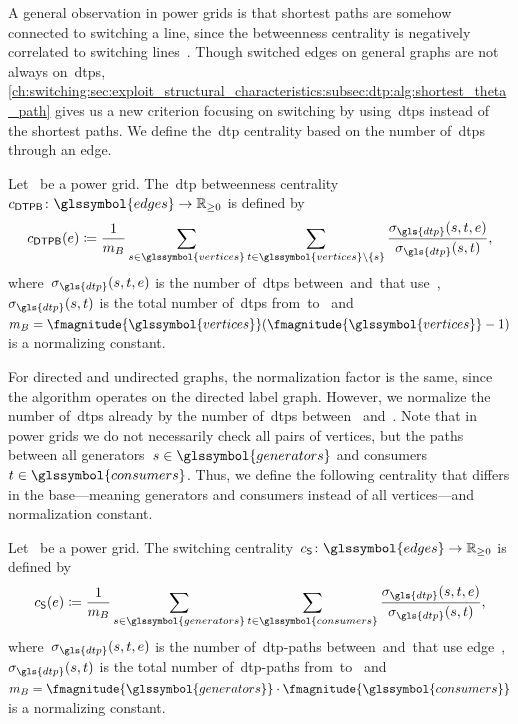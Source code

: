 A general observation in power grids is that shortest paths are somehow
connected to switching a line, since the betweenness centrality is negatively
correlated to switching lines~\parencite{4438889}.
% 
Though switched edges on general graphs are not always on~\gls{dtp}{s},
\cref{ch:switching:sec:exploit_structural_characteristics:subsec:dtp:alg:shortest_theta_path} gives us a new criterion focusing on switching by
using~\gls{dtp}{s} instead of the shortest paths. We define
the~\gls{dtp} centrality based on the number of~\gls{dtp}{s} through
an edge.
% 
\begin{definition}
% 
    Let~ be a power grid. The~\gls{dtp} betweenness
    centrality~$c_{\sbc}\colon\glssymbol{edges}\to\posreals$ is defined by
    \begin{equation}
        c_{\sbc}(\edge) \coloneqq 
        \frac{1}{m_B}\sum_{\source\in\glssymbol{vertices}}
        \sum_{\sink\in\glssymbol{vertices}\setminus\{\source\}}
        \frac{\sigma_{\gls{dtp}}(\source, \sink, \edge)}{\sigma_{\gls{dtp}}(\source,
        \sink)},
    \end{equation}
    where~$\sigma_{\gls{dtp}}(\source, \sink, \edge)$ is the number
    of~\gls{dtp}{s} between~\source and~\sink that use~\edge,
    $\sigma_{\gls{dtp}}(\source,
    \sink)$ is the total number of~\gls{dtp}{s} from~\source to~\sink 
    and~$m_B = \fmagnitude{\glssymbol{vertices}}
    (\fmagnitude{\glssymbol{vertices}} - 1)$ is a normalizing constant.
    \label{ch:switching:sec:exploit_structural_characteristics:def:dtp_betweenness_centrality}
\end{definition}
% 
% 
For directed and undirected graphs, the normalization factor is the same, since
the algorithm operates on the directed label graph. However, we normalize the
number of~\gls{dtp}{s} already by the number of~\gls{dtp}{s} between~\source
and~\sink. Note that in power grids we do not necessarily check all pairs of
vertices, but the paths between all
generators~$\source\in\glssymbol{generators}$ and
consumers~$\sink\in\glssymbol{consumers}$. Thus, we define the following
centrality that differs in the base---meaning generators and consumers instead
of all vertices---and normalization constant.
% 
\begin{definition}%
    Let~ be a power grid. The switching
    centrality~$c_{\scu}\colon\glssymbol{edges}\to\posreals$ is defined by%
    \begin{equation}%
        c_{\scu}(\edge) \coloneqq
        \frac{1}{m_B}\sum_{\source\in\glssymbol{generators}}
        \sum_{\sink\in\glssymbol{consumers}}
        \frac{\sigma_{\gls{dtp}}(\source, \sink,
        \edge)}{\sigma_{\gls{dtp}}
        (\source,
     \sink)},%
    \end{equation}%
    where~$\sigma_{\gls{dtp}}(\source, \sink, \edge)$ is the number
    of~\gls{dtp}-paths between~\source and~\sink that use edge~\edge,
    $\sigma_{\gls{dtp}}(\source, \sink)$ is the total number of~\gls{dtp}-paths
    from~\source to~\sink
    and~$m_B=\fmagnitude{\glssymbol{generators}}\cdot\fmagnitude{\glssymbol{consumers}}$
    is a normalizing constant.%
    \label{ch:switching:sec:exploit_structural_characteristics:def:s_t_dtp_betweenness_centrality}%
\end{definition}%
